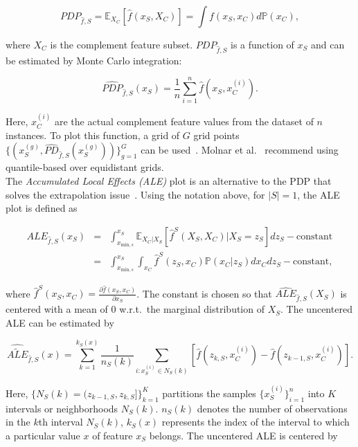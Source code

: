 \documentclass[runningheads]{llncs}
\begin{document}
\begin{equation}
    PDP_{\hat f, S} = \mathbb{E}_{X_C}[\hat{f}(x_S, X_C)] = \int f(x_S, x_C)d\mathbb{P}(x_C),
\end{equation}

\noindent where $X_C$ is the complement feature subset. $PDP_{\hat f, S}$ is a
function of $x_S$ and can be estimated by Monte Carlo integration:

\begin{equation}\label{eq:pdp-estimate}
    \widehat{PDP}_{\hat f, S}(x_S) = \frac{1}{n} \sum_{i=1}^{n} \hat{f}(x_S, x_C^{(i)}).
\end{equation}

\noindent Here, $x_C^{(i)}$ are the actual complement feature values from the dataset of $n$ instances.
To plot this function, a grid of $G$ grid points
$\{(x_S^{(g)}, \widehat{PD}_{\hat f, S}(x_S^{(g)}))\}_{g=1}^G$ can be used~\cite{molnar_relating_2023}.  %
Molnar et al.~\cite{molnar_general_2022} recommend using quantile-based over equidistant grids.\\

\noindent The \textit{Accumulated Local Effects (ALE)} plot is an alternative to the PDP that
solves the extrapolation issue~\cite{apley_visualizing_2020}. Using the notation above,
for $|S|=1$, the ALE plot is defined as

\begin{eqnarray}
    ALE_{\hat f,S}(x_S) &=& \int_{x_{\text{min},s}}^{x_S} \mathbb{E}_{X_C|X_S}
    \left[\hat{f}^S(X_S, X_C)|X_S = z_S\right] dz_S - \text{constant} \\
    &=& \int_{x_{\text{min},s}}^{x_S} \int_{x_C}
    \hat{f}^S(z_S, x_C)\mathbb{P}(x_C|z_S)dx_{C}dz_{S} - \text{constant},
\end{eqnarray}

\noindent where $\hat{f}^S(x_S, x_C) = \frac{\partial \hat{f}(x_S, x_C)}{\partial x_S}$.
The constant is chosen so that $\widehat{ALE}_{\hat f,S}(X_S)$ is centered with a mean of $0$
w.r.t.\ the marginal distribution of $X_S$. The uncentered ALE can be estimated by

\begin{equation}\label{eq:ale-estimate-uncentered}
    \widehat{\widetilde{ALE}}_{\hat f, S}(x) =
    \sum_{k=1}^{k_S(x)} \frac{1}{n_S(k)} \sum_{i:x_S^{(i)} \in N_S(k)}
    \left[\hat f(z_{k,S}, x_{C}^{(i)}) - \hat f(z_{k-1,S}, x_{C}^{(i)})\right].
\end{equation}

\noindent Here, $\{N_S(k) = (z_{k-1,S}, z_{k,S}]\}_{k=1}^{K}$ partitions the samples  %
$\{x^{(i)}_S\}_{i=1}^n$ into $K$ intervals or neighborhoods $N_S(k)$. $n_S(k)$ denotes  %
the number of observations in the $k$th interval $N_S(k)$, $k_S(x)$ represents the index
of the interval to which a particular value $x$ of feature $x_S$ belongs.
The uncentered ALE is centered by
\end{document}
